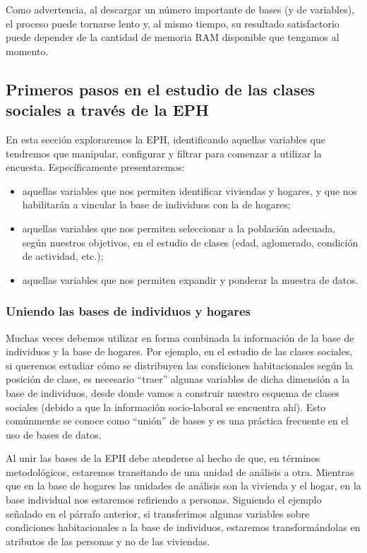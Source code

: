 \documentclass[
]{article}
\begin{document}
Como advertencia, al descargar un número importante de bases (y de variables), el proceso puede tornarse lento y, al mismo tiempo, su resultado satisfactorio puede depender de la cantidad de memoria RAM disponible que tengamos al momento.

\hypertarget{eph3}{%
\subsection{Primeros pasos en el estudio de las clases sociales a través de la EPH}\label{eph3}}

En esta sección exploraremos la EPH, identificando aquellas variables que tendremos que manipular, configurar y filtrar para comenzar a utilizar la encuesta. Específicamente presentaremos:

\begin{itemize}
\item
  aquellas variables que nos permiten identificar viviendas y hogares, y que nos habilitarán a vincular la base de individuos con la de hogares;
\item
  aquellas variables que nos permiten seleccionar a la población adecuada, según nuestros objetivos, en el estudio de clases (edad, aglomerado, condición de actividad, etc.);
\item
  aquellas variables que nos permiten expandir y ponderar la muestra de datos.
\end{itemize}

\hypertarget{uniendo-las-bases-de-individuos-y-hogares}{%
\subsubsection{Uniendo las bases de individuos y hogares}\label{uniendo-las-bases-de-individuos-y-hogares}}

Muchas veces debemos utilizar en forma combinada la información de la base de individuos y la base de hogares. Por ejemplo, en el estudio de las clases sociales, si queremos estudiar cómo se distribuyen las condiciones habitacionales según la posición de clase, es necesario ``traer'' algunas variables de dicha dimensión a la base de individuos, desde donde vamos a construir nuestro esquema de clases sociales (debido a que la información socio-laboral se encuentra ahí). Esto comúnmente se conoce como ``unión'' de bases y es una práctica frecuente en el uso de bases de datos.

Al unir las bases de la EPH debe atenderse al hecho de que, en términos metodológicos, estaremos transitando de una unidad de análisis a otra. Mientras que en la base de hogares las unidades de análisis son la vivienda y el hogar, en la base individual nos estaremos refiriendo a personas. Siguiendo el ejemplo señalado en el párrafo anterior, si transferimos algunas variables sobre condiciones habitacionales a la base de individuos, estaremos transformándolas en atributos de las personas y no de las viviendas.
\end{document}
